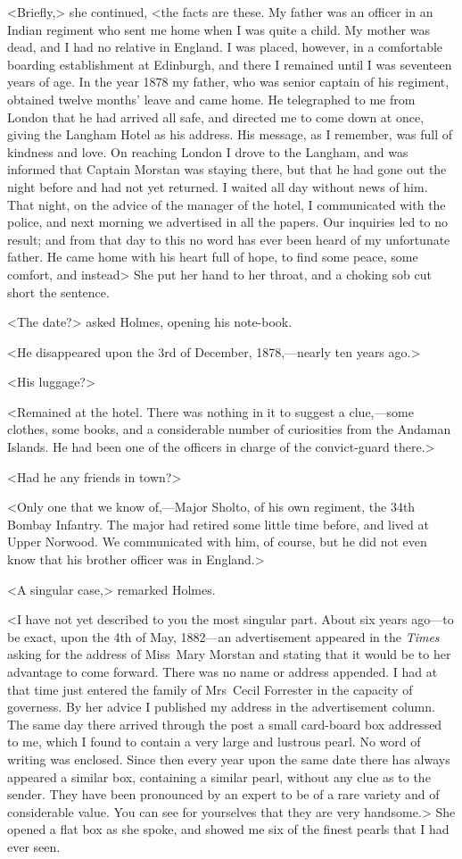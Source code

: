 <Briefly,> she continued, <the facts are these. My father was an officer in an Indian regiment who sent me home when I was quite a child. My mother was dead, and I had no relative in England. I was placed, however, in a comfortable boarding establishment at Edinburgh, and there I remained until I was seventeen years of age. In the year 1878 my father, who was senior captain of his regiment, obtained twelve months' leave and came home. He telegraphed to me from London that he had arrived all safe, and directed me to come down at once, giving the Langham Hotel as his address. His message, as I remember, was full of kindness and love. On reaching London I drove to the Langham, and was informed that Captain Morstan was staying there, but that he had gone out the night before and had not yet returned. I waited all day without news of him. That night, on the advice of the manager of the hotel, I communicated with the police, and next morning we advertised in all the papers. Our inquiries led to no result; and from that day to this no word has ever been heard of my unfortunate father. He came home with his heart full of hope, to find some peace, some comfort, and instead\longdash> She put her hand to her throat, and a choking sob cut short the sentence.

<The date?> asked Holmes, opening his note-book.

<He disappeared upon the 3rd of December, 1878,—nearly ten years ago.>

<His luggage?>

<Remained at the hotel. There was nothing in it to suggest a clue,—some clothes, some books, and a considerable number of curiosities from the Andaman Islands. He had been one of the officers in charge of the convict-guard there.>

<Had he any friends in town?>

<Only one that we know of,—Major Sholto, of his own regiment, the 34th Bombay Infantry. The major had retired some little time before, and lived at Upper Norwood. We communicated with him, of course, but he did not even know that his brother officer was in England.>

<A singular case,> remarked Holmes.

<I have not yet described to you the most singular part. About six years ago—to be exact, upon the 4th of May, 1882—an advertisement appeared in the \textit{Times} asking for the address of Miss~Mary Morstan and stating that it would be to her advantage to come forward. There was no name or address appended. I had at that time just entered the family of Mrs~Cecil Forrester in the capacity of governess. By her advice I published my address in the advertisement column. The same day there arrived through the post a small card-board box addressed to me, which I found to contain a very large and lustrous pearl. No word of writing was enclosed. Since then every year upon the same date there has always appeared a similar box, containing a similar pearl, without any clue as to the sender. They have been pronounced by an expert to be of a rare variety and of considerable value. You can see for yourselves that they are very handsome.> She opened a flat box as she spoke, and showed me six of the finest pearls that I had ever seen.

